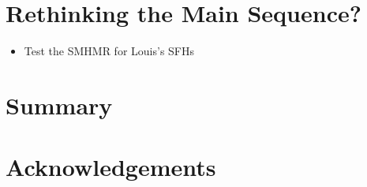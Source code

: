 \documentclass[12pt, letterpaper, preprint]{aastex}
\newcommand{\bitem}{\begin{itemize}}
\newcommand{\eitem}{\end{itemize}}
\begin{document}
\section{Rethinking the Main Sequence?}
\bitem 
\item Test the SMHMR for Louis's SFHs 
\eitem 

\section{Summary} \label{sec:summary}

\section*{Acknowledgements}



\end{document}
